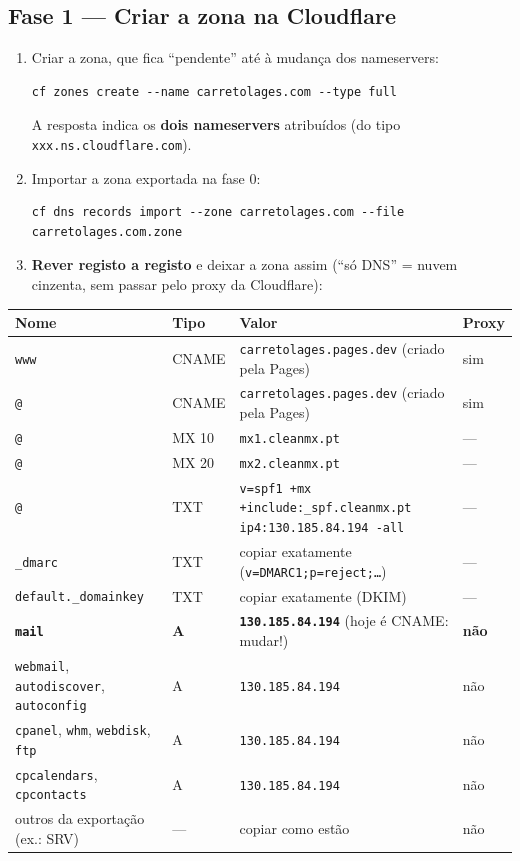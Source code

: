 \documentclass[11pt,a4paper]{article}
\begin{document}
\subsection{Fase 1 --- Criar a zona na Cloudflare}
\begin{enumerate}
  \item Criar a zona, que fica ``pendente'' até à mudança dos nameservers:
\begin{verbatim}
cf zones create --name carretolages.com --type full
\end{verbatim}
        A resposta indica os \textbf{dois nameservers} atribuídos (do tipo \texttt{xxx.ns.cloudflare.com}).
  \item Importar a zona exportada na fase 0:
\begin{verbatim}
cf dns records import --zone carretolages.com --file carretolages.com.zone
\end{verbatim}
  \item \textbf{Rever registo a registo} e deixar a zona assim (``só DNS'' = nuvem cinzenta, sem passar pelo
        proxy da Cloudflare):
\end{enumerate}

\begin{center}\small
\renewcommand{\arraystretch}{1.2}
\begin{tabularx}{\linewidth}{@{}llXl@{}}
\toprule
\textbf{Nome} & \textbf{Tipo} & \textbf{Valor} & \textbf{Proxy} \\ \midrule
\texttt{www} & CNAME & \texttt{carretolages.pages.dev} (criado pela Pages) & sim \\
\texttt{@} & CNAME & \texttt{carretolages.pages.dev} (criado pela Pages) & sim \\
\texttt{@} & MX 10 & \texttt{mx1.cleanmx.pt} & --- \\
\texttt{@} & MX 20 & \texttt{mx2.cleanmx.pt} & --- \\
\texttt{@} & TXT & \texttt{v=spf1 +mx +include:\_spf.cleanmx.pt ip4:130.185.84.194 -all} & --- \\
\texttt{\_dmarc} & TXT & copiar exatamente (\texttt{v=DMARC1;p=reject;\ldots}) & --- \\
\texttt{default.\_domainkey} & TXT & copiar exatamente (DKIM) & --- \\
\textbf{\texttt{mail}} & \textbf{A} & \textbf{\texttt{130.185.84.194}} (hoje é CNAME: mudar!) & \textbf{não} \\
\texttt{webmail}, \texttt{autodiscover}, \texttt{autoconfig} & A & \texttt{130.185.84.194} & não \\
\texttt{cpanel}, \texttt{whm}, \texttt{webdisk}, \texttt{ftp} & A & \texttt{130.185.84.194} & não \\
\texttt{cpcalendars}, \texttt{cpcontacts} & A & \texttt{130.185.84.194} & não \\
outros da exportação (ex.: SRV) & --- & copiar como estão & não \\
\bottomrule
\end{tabularx}
\end{center}
\end{document}
